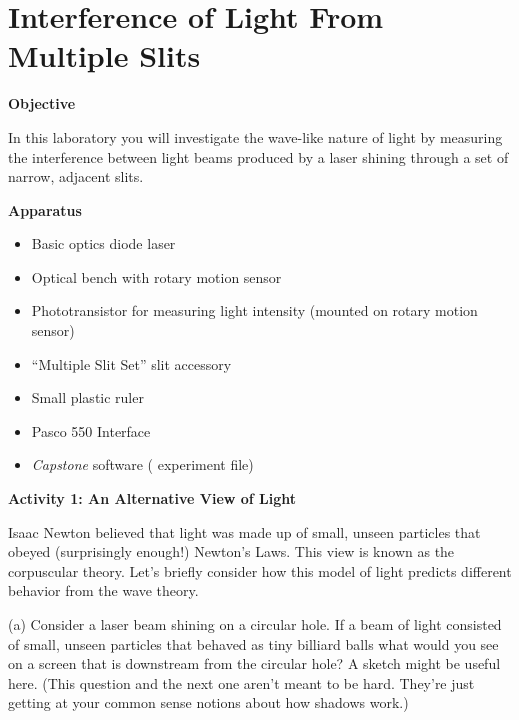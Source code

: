 
\section{Interference of Light From Multiple Slits}
\label{interference_lab}
\makelabheader %

\textbf{Objective}

In this laboratory you will investigate the wave-like nature of light by measuring the interference 
between light beams produced by a laser shining through a set of narrow, adjacent
slits. 

\textbf{Apparatus}

\begin{itemize}
\item Basic optics diode laser
\item Optical bench with rotary motion sensor
\item Phototransistor for measuring light intensity (mounted on rotary motion sensor)
\item ``Multiple Slit Set'' slit accessory
\item Small plastic ruler
\item Pasco 550 Interface 
\item \textit{Capstone} software ( experiment file)
\end{itemize}


\textbf{Activity 1: An Alternative View of Light}

Isaac Newton believed that light was made up of small, unseen particles
that obeyed (surprisingly enough!) Newton's Laws. This view is known
as the corpuscular theory. Let's briefly consider how this model of light
predicts different behavior from the wave theory.

(a) Consider a laser beam shining on a circular hole. If a beam of
light consisted of small, unseen particles that behaved as tiny billiard
balls what would you see on a screen that is downstream from the circular
hole? A sketch might be useful here.  (This question and the next one aren't meant to be hard.
They're just getting at your common sense notions about how shadows work.)
\answerspace{35mm}

